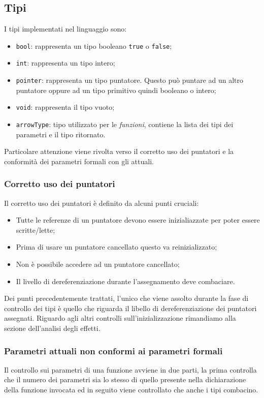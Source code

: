 \documentclass[../../main]{subfiles}
\begin{document}
\subsection{Tipi}
I tipi implementati nel linguaggio sono:
\begin{itemize}
    \item \verb|bool|: rappresenta un tipo booleano \verb|true| o \verb|false|;
    \item \verb|int|: rappresenta un tipo intero;
    \item \verb|pointer|: rappresenta un tipo puntatore. Questo può puntare ad un altro puntatore oppure ad un tipo primitivo quindi booleano o intero;
    \item \verb|void|: rappresenta il tipo vuoto;
    \item \verb|arrowType|: tipo utilizzato per le \textit{funzioni}, contiene la lista dei tipi dei parametri e il tipo ritornato.
\end{itemize}

Particolare attenzione viene rivolta verso il corretto uso dei puntatori e la conformità dei parametri formali con gli attuali.
\subsubsection{Corretto uso dei puntatori}
Il corretto uso dei puntatori è definito da alcuni punti cruciali:
\begin{itemize}
    \item Tutte le referenze di un puntatore devono essere inizialiazzate per poter essere scritte/lette;
    \item Prima di usare un puntatore cancellato questo va reinizializzato;
    \item Non è possibile accedere ad un puntatore cancellato;
    \item Il livello di dereferenziazione durante l'assegnamento deve combaciare.
\end{itemize}
Dei punti precedentemente trattati, l'unico che viene assolto durante la fase di controllo dei tipi è quello che riguarda il libello di dereferenziazione dei puntatori assegnati. Riguardo agli altri controlli sull'inizializzazione rimandiamo alla sezione dell'analisi degli effetti.
\subsubsection{Parametri attuali non conformi ai parametri formali}
Il controllo sui parametri di una funzione avviene in due parti, la prima controlla che il numero dei parametri sia lo stesso di quello presente
nella dichiarazione della funzione invocata ed in seguito viene controllato che anche i tipi combacino.
\end{document}

